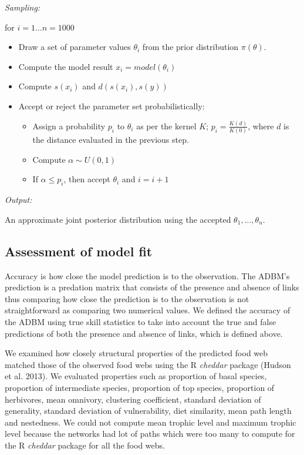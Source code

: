 \documentclass{article}
\begin{document}
\emph{Sampling:}

for \(i = 1 \dots n = 1000\)

\begin{itemize}
\item
  Draw a set of parameter values \(\theta_i\) from the prior
  distribution \(\pi(\theta)\).
\item
  Compute the model result \(x_i = model(\theta_i)\)
\item
  Compute \(s(x_i)\) and \(d(s(x_i), s(y))\)
\item
  Accept or reject the parameter set probabilistically:

  \begin{itemize}
  \item
    Assign a probability \(p_i\) to \(\theta_i\) as per the kernel
    \(K\); \(p_i = \frac{K(d)}{K(0)}\), where \(d\) is the distance
    evaluated in the previous step.
  \item
    Compute \(\alpha \sim U(0,1)\)
  \item
    If \(\alpha \leq p_i\), then accept \(\theta_i\) and \(i = i + 1\)
  \end{itemize}
\end{itemize}

\emph{Output:}

An approximate joint posterior distribution using the accepted
\(\theta_1, \dots, \theta_n\).

\hypertarget{assessment-of-model-fit}{%
\subsection{Assessment of model fit}\label{assessment-of-model-fit}}

Accuracy is how close the model prediction is to the observation. The
ADBM's prediction is a predation matrix that consists of the presence
and absence of links thus comparing how close the prediction is to the
observation is not straightforward as comparing two numerical values. We
defined the accuracy of the ADBM using true skill statistics to take
into account the true and false predictions of both the presence and
absence of links, which is defined above.

We examined how closely structural properties of the predicted food web
matched those of the observed food webs using the R \emph{cheddar}
package (Hudson et al. 2013). We evaluated properties such as proportion
of basal species, proportion of intermediate species, proportion of top
species, proportion of herbivores, mean omnivory, clustering
coefficient, standard deviation of generality, standard deviation of
vulnerability, diet similarity, mean path length and nestedness. We
could not compute mean trophic level and maximum trophic level because
the networks had lot of paths which were too many to compute for the R
\emph{cheddar} package for all the food webs.
\end{document}
